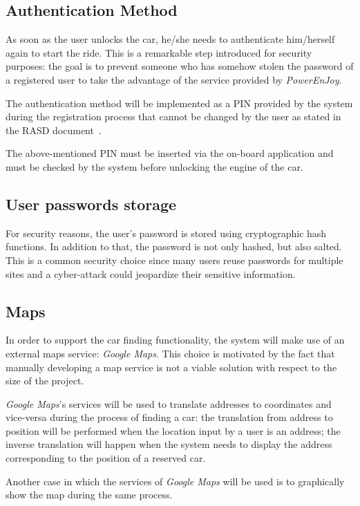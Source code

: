 \subsection{Authentication Method}
As soon as the user unlocks the car, he/she needs to authenticate him/herself again to start the ride. This is a remarkable step introduced for security purposes: the goal is to prevent someone who has somehow stolen the password of a registered user to take the advantage of the service provided by \emph{PowerEnJoy}.

The authentication method will be implemented as a PIN provided by the system during the registration process that cannot be changed by the user as stated in the RASD document~\cite{rasd}.

The above-mentioned PIN must be inserted via the on-board application and must be checked by the system before unlocking the engine of the car.

\subsection{User passwords storage}
For security reasons, the user's password is stored using cryptographic hash functions. In addition to that, the password is not only hashed, but also salted. This is a common security choice since many users reuse passwords for multiple sites and a cyber-attack could jeopardize their sensitive information.

\subsection{Maps}
In order to support the car finding functionality, the system will make use of an external maps service: \textit{Google Maps}. This choice is motivated by the fact that manually developing a map service is not a viable solution with respect to the size of the project.

\textit{Google Maps}'s services will be used to translate addresses to coordinates and vice-versa during the process of finding a car: the translation from address to position will be performed when the location input by a user is an address; the inverse translation will happen when the system needs to display the address corresponding to the position of a reserved car.

Another case in which the services of \textit{Google Maps} will be used is to graphically show the map during the same process.